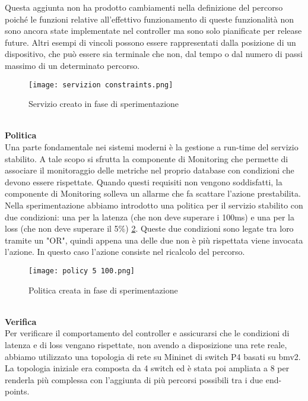 Questa aggiunta non ha prodotto cambiamenti nella definizione del percorso poiché le funzioni relative all'effettivo funzionamento di queste funzionalità non 
sono ancora state implementate nel controller ma sono solo pianificate per release future.
Altri esempi di vincoli possono essere rappresentati dalla posizione di un dispositivo, che può essere sia terminale che non, dal tempo o dal numero di passi massimo di un determinato percorso.
\begin{figure}[h]
    \centering
   \texttt{[image: servizion constraints.png]}
    \caption{Servizio creato in fase di sperimentazione}
    \label{fig:constraints}
\end{figure}
\\\textbf{Politica}
\\Una parte fondamentale nei sistemi moderni è la gestione a run-time del servizio stabilito\cite{demo}.
A tale scopo si sfrutta la componente di Monitoring che permette di associare il monitoraggio delle metriche nel proprio database
con condizioni che devono essere rispettate.
Quando questi requisiti non vengono soddisfatti, la componente di Monitoring solleva un allarme che fa scattare l'azione prestabilita.
\\Nella sperimentazione abbiamo introdotto una politica per il servizio stabilito con due condizioni: una per la latenza (che non deve superare i 100ms) e una per la loss (che non deve superare il 5\%) \ref{fig:policy}.
Queste due condizioni sono legate tra loro tramite un "OR", quindi appena una delle due non è più rispettata viene invocata l'azione.
In questo caso l'azione consiste nel ricalcolo del percorso.
\begin{figure}[h]
    \centering
   \texttt{[image: policy 5 100.png]}
    \caption{Politica creata in fase di sperimentazione}
    \label{fig:policy}
\end{figure}
\\\textbf{Verifica}
\\Per verificare il comportamento del controller e assicurarsi che le condizioni di latenza e di loss vengano rispettate, 
non avendo a disposizione una rete reale, abbiamo utilizzato una topologia di rete su Mininet di switch P4 basati su bmv2\cite{bmv2}.
La topologia iniziale era composta da 4 switch ed è stata poi ampliata a 8 per renderla più complessa con l'aggiunta di più percorsi possibili tra i due end-points.
